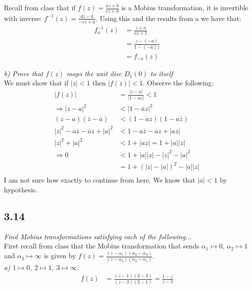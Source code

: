 \documentclass[a4paper, 11pt]{article}
\begin{document}
	\noindent Recall from class that if $f(z)=\frac{az+b}{cz+d}$ is a Mobius transformation, it is invertible with inverse: $f^{-1}(z) = \frac{dz-b}{-cz+a}$. Using this and the results from a we have that:
		\begin{align*}
			f_a^{-1}(z) &= \frac{z+a}{\overline{a}z+1} \\
				&= \frac{z-(-a)}{1-(-\overline{a})z} \\ 
				&= f_{-a}(z) 
		\end{align*}
		
	\noindent\textit{b) Prove that $f(z)$ maps the unit disc $D_1(0)$ to itself}\\
	
	\noindent We must show that if $|z|< 1$ then $|f(z)|<1$. Observe the following: 
		\begin{align*}
			|f(z)| &= \frac{|z-a|}{|1-\overline{a}z|} < 1 \\ 
			\Rightarrow |z-a|^2& < |1-\overline{a}z|^2 \\ 
			(z-a)(\overline{z}-\overline{a}) &< (1-\overline{a}z)(1-a\overline{z}) \\
			|z|^2-a\overline{z}-\overline{a}z+|a|^2 &< 1-a\overline{z}-\overline{a}z+|az| \\
			|z|^2+|a|^2 &< 1+|az| = 1+|a||z| \\ 
			\Rightarrow 0 &<  1+|a||z|-|z|^2-|a|^2 \\ 
				&= 1+(|z|-|a|)^2-|a||z|  \\ 
		\end{align*}
	\noindent I am not sure how exactly to continue from here. We know that $|a|<1$ by hypothesis. 
	
\subsection*{3.14}
	\textit{Find Mobius transformations satisfying each of the following...}\\ 
	
	\noindent First recall from class that the Mobius transformation that sends $\alpha_1 \mapsto 0$, $\alpha_2 \mapsto 1$ and $\alpha_3\mapsto\infty$ is given by $f(z) = \frac{(z-\alpha_1)(\alpha_2-\alpha_3)}{(z-\alpha_3)(\alpha_2-\alpha_1)}$. \\
	
	\noindent\textit{a) $1 \mapsto 0$, $2 \mapsto 1$, $3\mapsto \infty$.}\\
		\begin{align*}
			f(z) &= \frac{(z-1)(2-3)}{(z-3)(2-1)} = \frac{1-z}{z-3}
		\end{align*}
		
\end{document}
